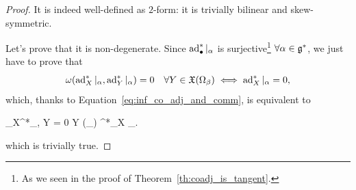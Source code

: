 \documentclass[main.tex]{subfiles}
\begin{document}
\begin{proof}
	It is indeed well-defined as $2$-form: it is trivially bilinear and skew-symmetric.

	Let's prove that it is non-degenerate. Since $\operatorname{ad}_{\bullet}^*\vert_\alpha$ is surjective\footnote{As we seen in the proof of Theorem~\ref{th:coadj_is_tangent}.} $\forall\alpha\in\mathfrak g^*$, we just have to prove that
	\begin{equation}
		\omega(\operatorname{ad}^*_X\vert_\alpha, \operatorname{ad}^*_Y\vert_\alpha) = 0  \quad \forall Y \in \mathfrak{X}(\Omega_\beta) \iff \operatorname{ad}^*_X \vert_\alpha=0,
	\end{equation}
	which, thanks to Equation~\eqref{eq:inf_co_adj_and_comm}, is equivalent to
	\begin{eqalign}
		\langle \ad_X^*\vert_\alpha, Y \rangle = 0  \quad \forall Y \in \fields(\Omega_\beta) \iff \ad^*_X \vert_.
	\end{eqalign}
	which is trivially true.


\end{proof}
\end{document}
